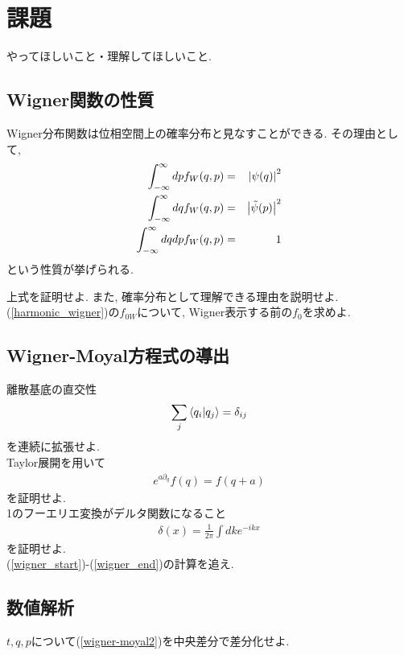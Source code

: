 \documentclass[10.5pt,a4paper]{jsarticle}
\begin{document}
\section{課題}
やってほしいこと・理解してほしいこと. 
\subsection{Wigner関数の性質}
Wigner分布関数は位相空間上の確率分布と見なすことができる. その理由として,
\begin{eqnarray}
  \int_{-\infty}^{\infty}dp f_W(q, p) &=& \qty|\psi(q)|^2\\
  \int_{-\infty}^{\infty}dq f_W(q, p) &=& \qty|\tilde{\psi}(p)|^2\\
  \int_{-\infty}^{\infty}dqdp f_W(q, p) &=& 1
\end{eqnarray}
という性質が挙げられる.

 上式を証明せよ. また, 確率分布として理解できる理由を説明せよ.\\

 (\ref{harmonic_wigner})の$f_{0W}$について, Wigner表示する前の$f_0$を求めよ. 
\subsection{Wigner-Moyal方程式の導出}
 離散基底の直交性
\begin{eqnarray}
  \sum_j \bra{q_i}\ket{q_j} = \delta_{ij}
\end{eqnarray}
を連続に拡張せよ.\\

 Taylor展開を用いて
\begin{eqnarray}
  e^{a\partial_q}f(q) = f(q+a)
\end{eqnarray}
を証明せよ.\\

 1のフーエリエ変換がデルタ関数になること
\begin{eqnarray}
  \delta(x) = \frac{1}{2\pi}\int dk e^{-ikx}
\end{eqnarray}
を証明せよ.\\

 (\ref{wigner_start})-(\ref{wigner_end})の計算を追え.\\

\subsection{数値解析}
 $t, q, p$について(\ref{wigner-moyal2})を中央差分で差分化せよ.\\
\end{document}
